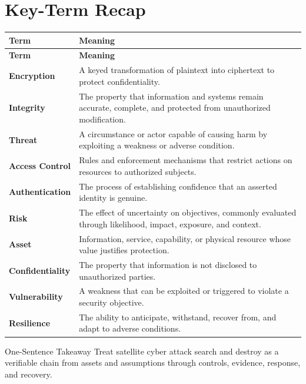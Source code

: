 \documentclass[11pt,letterpaper]{article}
\begin{document}
\section*{Key-Term Recap}
\begin{longtable}{>{\raggedright\arraybackslash}p{}>{\raggedright\arraybackslash}p{}}
\toprule\rowcolor{Navy}\color{white}\textbf{Term} & \color{white}\textbf{Meaning}\\\midrule
\endfirsthead
\toprule\rowcolor{Navy}\color{white}\textbf{Term} & \color{white}\textbf{Meaning}\\\midrule
\endhead
\textbf{Encryption} & A keyed transformation of plaintext into ciphertext to protect confidentiality. \\\midrule
\textbf{Integrity} & The property that information and systems remain accurate, complete, and protected from unauthorized modification. \\\midrule
\textbf{Threat} & A circumstance or actor capable of causing harm by exploiting a weakness or adverse condition. \\\midrule
\textbf{Access Control} & Rules and enforcement mechanisms that restrict actions on resources to authorized subjects. \\\midrule
\textbf{Authentication} & The process of establishing confidence that an asserted identity is genuine. \\\midrule
\textbf{Risk} & The effect of uncertainty on objectives, commonly evaluated through likelihood, impact, exposure, and context. \\\midrule
\textbf{Asset} & Information, service, capability, or physical resource whose value justifies protection. \\\midrule
\textbf{Confidentiality} & The property that information is not disclosed to unauthorized parties. \\\midrule
\textbf{Vulnerability} & A weakness that can be exploited or triggered to violate a security objective. \\\midrule
\textbf{Resilience} & The ability to anticipate, withstand, recover from, and adapt to adverse conditions. \\\midrule
\bottomrule
\end{longtable}
\begin{CornellExamBox}{One-Sentence Takeaway}
Treat satellite cyber attack search and destroy as a verifiable chain from assets and assumptions through controls, evidence, response, and recovery.
\end{CornellExamBox}
\end{document}
